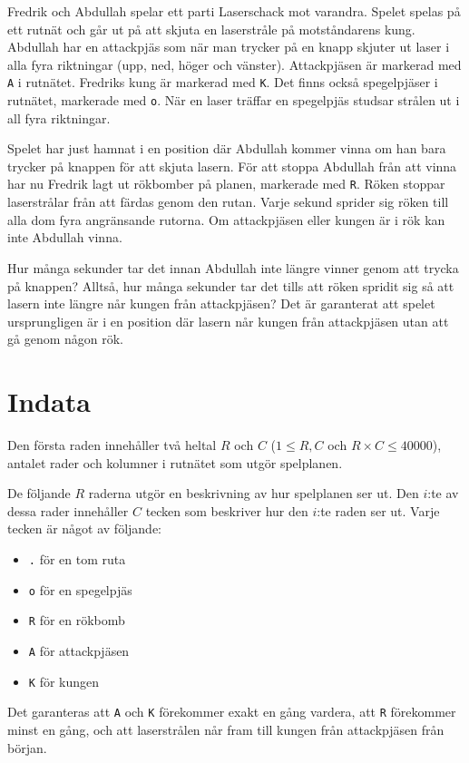Fredrik och Abdullah spelar ett parti Laserschack mot varandra. Spelet spelas på ett rutnät
och går ut på att skjuta en laserstråle på motståndarens kung.
Abdullah har en attackpjäs som när man trycker på en knapp skjuter ut laser i alla fyra riktningar (upp, ned, höger och vänster).
Attackpjäsen är markerad med \texttt{A} i rutnätet.
Fredriks kung är markerad med \texttt{K}. Det finns också spegelpjäser i rutnätet, markerade med \texttt{o}.
När en laser träffar en spegelpjäs studsar strålen ut i all fyra riktningar.

Spelet har just hamnat i en position där Abdullah kommer vinna om han bara trycker på knappen för att skjuta lasern.
För att stoppa Abdullah från att vinna har nu Fredrik lagt ut rökbomber på planen, markerade med \texttt{R}.
Röken stoppar laserstrålar från att färdas genom den rutan. Varje sekund sprider sig röken till alla dom fyra angränsande rutorna.
Om attackpjäsen eller kungen är i rök kan inte Abdullah vinna. 

Hur många sekunder tar det innan Abdullah inte längre vinner genom att trycka på knappen?
Alltså, hur många sekunder tar det tills att röken spridit sig så att lasern inte längre når kungen från attackpjäsen?
Det är garanterat att spelet ursprungligen är i en position där lasern når kungen från attackpjäsen utan att gå genom någon rök.

\section*{Indata}
Den första raden innehåller två heltal $R$ och $C$ ($1\le R, C$ och $R\times C \le 40 000$), antalet rader och kolumner i rutnätet som utgör spelplanen.

De följande $R$ raderna utgör en beskrivning av hur spelplanen ser ut.
Den $i$:te av dessa rader innehåller $C$ tecken som beskriver hur den $i$:te raden ser ut.
Varje tecken är något av följande:
\begin{itemize}
    \item \texttt{.} för en tom ruta
    \item \texttt{o} för en spegelpjäs
    \item \texttt{R} för en rökbomb
    \item \texttt{A} för attackpjäsen
    \item \texttt{K} för kungen
\end{itemize}
Det garanteras att \texttt{A} och \texttt{K} förekommer exakt en gång vardera,
att \texttt{R} förekommer minst en gång,
och att laserstrålen når fram till kungen från attackpjäsen från början.

